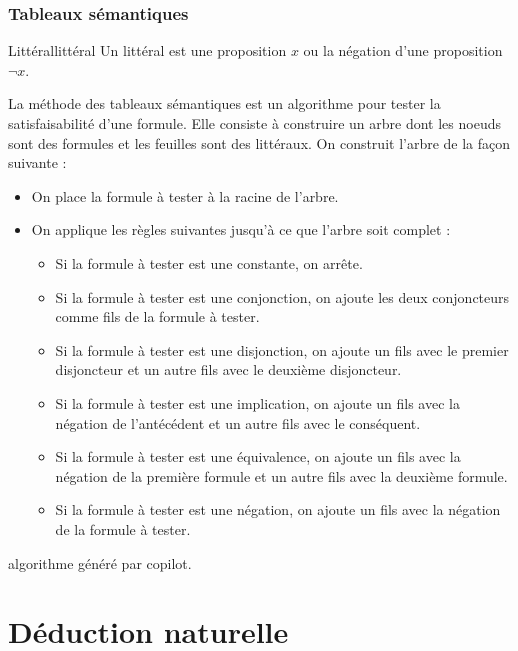 \documentclass[a4paper, 12pt]{extarticle}
\begin{document}
\subsubsection{Tableaux sémantiques}
\begin{definition}{Littéral}{littéral}
  Un littéral est une proposition $x$ ou la négation d'une proposition $\neg x$.
\end{definition}
La méthode des tableaux sémantiques est un algorithme pour tester la satisfaisabilité d'une formule. Elle consiste à construire un arbre dont les noeuds sont des formules et les feuilles sont des littéraux. On construit l'arbre de la façon suivante :
\begin{itemize}[label=$\bullet$]
  \item On place la formule à tester à la racine de l'arbre.
  \item On applique les règles suivantes jusqu'à ce que l'arbre soit complet :
  \begin{itemize}[label=$\circ$]
    \item Si la formule à tester est une constante, on arrête.
    \item Si la formule à tester est une conjonction, on ajoute les deux conjoncteurs comme fils de la formule à tester.
    \item Si la formule à tester est une disjonction, on ajoute un fils avec le premier disjoncteur et un autre fils avec le deuxième disjoncteur.
    \item Si la formule à tester est une implication, on ajoute un fils avec la négation de l'antécédent et un autre fils avec le conséquent.
    \item Si la formule à tester est une équivalence, on ajoute un fils avec la négation de la première formule et un autre fils avec la deuxième formule.
    \item Si la formule à tester est une négation, on ajoute un fils avec la négation de la formule à tester.
  \end{itemize}
\end{itemize}
\begin{remark}
  algorithme généré par copilot.
\end{remark}






\section{Déduction naturelle}
\end{document}
